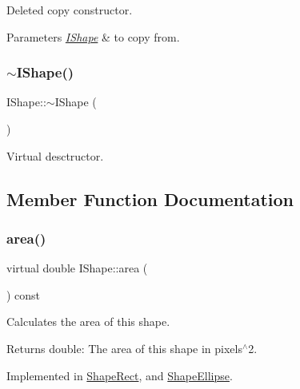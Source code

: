 Deleted copy constructor. 


\begin{DoxyParams}{Parameters}
{\em \mbox{\hyperlink{class_i_shape}{I\+Shape}}} & to copy from. \\
\hline
\end{DoxyParams}
\mbox{\label{class_i_shape_aec9c445c0213374af733e2038d702630}} 
\subsubsection{\texorpdfstring{$\sim$IShape()}{~IShape()}}
{\footnotesize\ttfamily I\+Shape\+::$\sim$\+I\+Shape (\begin{DoxyParamCaption}{ }\end{DoxyParamCaption})\hspace{0.3cm}{\ttfamily [virtual]}}



Virtual desctructor. 



\subsection{Member Function Documentation}
\mbox{\label{class_i_shape_aed742a160acdd13c9cfdeb16e605afea}} 
\subsubsection{\texorpdfstring{area()}{area()}}
{\footnotesize\ttfamily virtual double I\+Shape\+::area (\begin{DoxyParamCaption}{ }\end{DoxyParamCaption}) const\hspace{0.3cm}{\ttfamily [pure virtual]}}



Calculates the area of this shape. 

\begin{DoxyReturn}{Returns}
double\+: The area of this shape in pixels$^\wedge$2. 
\end{DoxyReturn}


Implemented in \mbox{\hyperlink{class_shape_rect_a87e891eaa6975fc73f4148427076812e}{Shape\+Rect}}, and \mbox{\hyperlink{class_shape_ellipse_a08287b301b7501eb941805eaf85fc00c}{Shape\+Ellipse}}.

